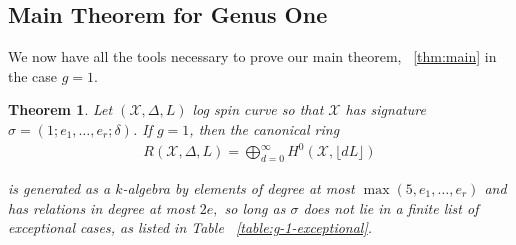 \documentclass{amsart}
\theoremstyle{plain}
\newtheorem{thm}{Theorem}[section]
\theoremstyle{definition}
\newtheorem{example}[thm]{Example}
\theoremstyle{remark}
\numberwithin{equation}{section}
\newcommand\ssec{\subsection}
\newcommand \sx{\mathscr X}
\DeclareMathOperator\di{Div}
\newcommand{\halfcan}{L}
\begin{document}
%
%
%


\ssec{Main Theorem for Genus One}
\label{ssec:main_g_1}

We now have all the tools necessary to prove our main theorem, ~\ref{thm:main} in the case $g = 1$. 

\begin{thm}
\label{thm:g-1-main}
Let $(\sx, \Delta, \halfcan)$ log spin curve so that $\sx$ has signature $\sigma = (1; e_1, \ldots, e_r; \delta)$.
If $g = 1$, then the canonical ring
\begin{align*}
	R(\sx, \Delta, \halfcan) = \bigoplus_{d = 0}^\infty H^0(\sx, \lfloor d L \rfloor)
\end{align*}

\noindent
is generated as a $k$-algebra by elements of degree at most $\max(5, e_1, \ldots, e_r)$ and has relations in degree at most $2e,$ so long as $\sigma$ does not lie in a
finite list of exceptional cases, as listed in Table
~\ref{table:g-1-exceptional}.
\end{thm}
\end{document}
